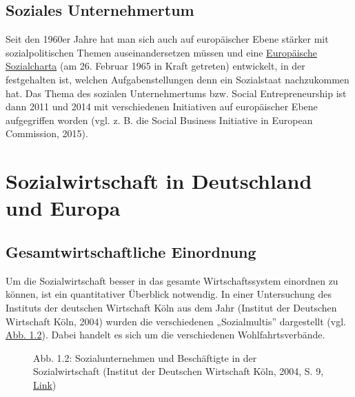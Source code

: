 \documentclass[
  letterpaper,
]{book}
\makeatletter
\newcommand*\pandocbounded[1]{%
  \sbox\pandoc@box{#1}%
  \Gscale@div\@tempa{\textheight}{\dimexpr\ht\pandoc@box+\dp\pandoc@box\relax}%
  \Gscale@div\@tempb{\linewidth}{\wd\pandoc@box}%
  \ifdim\@tempb\p@<\@tempa\p@\let\@tempa\@tempb\fi%
  \ifdim\@tempa\p@<\p@\scalebox{\@tempa}{\usebox\pandoc@box}%
  \else\usebox{\pandoc@box}%
  \fi%
}
\makeatother
\begin{document}
\subsection{Soziales Unternehmertum}\label{unternehmertum}

Seit den 1960er Jahre hat man sich auch auf europäischer Ebene stärker
mit sozialpolitischen Themen auseinandersetzen müssen und eine
\href{https://www.sozialcharta.eu/}{Europäische Sozialcharta} (am 26.
Februar 1965 in Kraft getreten) entwickelt, in der festgehalten ist,
welchen Aufgabenstellungen denn ein Sozialstaat nachzukommen hat. Das
Thema des sozialen Unternehmertums bzw. Social Entrepreneurship ist dann
2011 und 2014 mit verschiedenen Initiativen auf europäischer Ebene
aufgegriffen worden (vgl. z. B. die Social Business Initiative in
European Commission, 2015).

\section{Sozialwirtschaft in Deutschland und Europa}\label{deutschland}

\subsection{Gesamtwirtschaftliche Einordnung}\label{gesamtwirtschaft}

Um die Sozialwirtschaft besser in das gesamte Wirtschaftssystem
einordnen zu können, ist ein quantitativer Überblick notwendig. In einer
Untersuchung des Instituts der deutschen Wirtschaft Köln aus dem Jahr
(Institut der Deutschen Wirtschaft Köln, 2004) wurden die verschiedenen
„Sozialmultis'' dargestellt (vgl. \hyperref[figure12]{Abb. 1.2}). Dabei
handelt es sich um die verschiedenen Wohlfahrtsverbände.

\begin{figure}

\pandocbounded{\texttt{[image: images/figure12.png]}} \hfill{}

\caption{Abb. 1.2: Sozialunternehmen und Beschäftigte in der
Sozialwirtschaft (Institut der Deutschen Wirtschaft Köln, 2004, S. 9,
\href{https://www.yumpu.com/de/document/view/7199735/auf-den-schultern-der-schwachen}{Link})}

\end{figure}%
\end{document}

